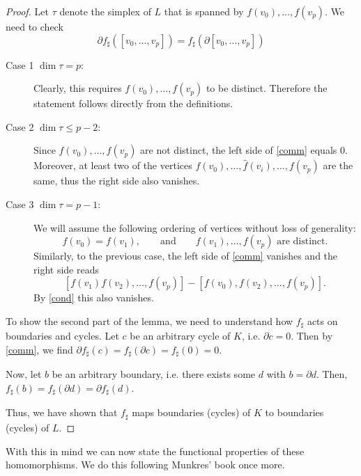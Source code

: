 \documentclass[toc=bib, headinclude]{scrartcl}
\theoremstyle{plain}
\theoremstyle{definition}
\theoremstyle{remark}
\newcommand{\qqandqq}{\qquad \text{and} \qquad}
\begin{document}
\begin{proof}

	Let $\tau$ denote the simplex of $L$ that is spanned by $f(v_0),\dots,f(v_p)$. We need to check 
	\begin{equation}\label{comm}
		\partial f_\sharp([v_0,\dots,v_p])=f_\sharp(\partial[v_0,\dots,v_p])
	\end{equation}
	\begin{description}
		\item[Case 1 ${\dim\tau=p}$:] Clearly, this requires $f(v_0),\dots,f(v_p)$ to be distinct. Therefore the statement follows directly from the definitions. %
		\item[Case 2 ${\dim\tau\leq p-2}$:] %
	Since $f(v_0),\dots,f(v_p)$ are not distinct, the left side of \eqref{comm} equals 0. Moreover, at least two of the vertices $f(v_0),\dots,\hat{f}(v_i),\dots,f(v_p)$ are the same, thus the right side also vanishes.
		\item[Case 3 ${\dim\tau=p-1}$:] We will assume the following ordering of vertices without loss of generality:
		\begin{equation}\label{cond}
		f(v_0)=f(v_1), \qqandqq f(v_1),\dots,f(v_p) \text{ are distinct.}
		\end{equation}
		Similarly, to the previous case, the left side of \eqref{comm} vanishes and the right side reads
		\[
		[f(v_1)f(v_2),\dots,f(v_p)]-[f(v_0),f(v_2),...,f(v_p)].
		\]
		By \eqref{cond} this also vanishes. 
	\end{description}

To show the second part of the lemma, we need to understand how $f_\sharp$ acts on boundaries and cycles. Let $c$ be an arbitrary cycle of $K$, i.e. $\partial c=0$. Then by \eqref{comm}, we find $\partial f_\sharp (c)=f_\sharp (\partial c)=f_\sharp(0)=0$.

Now, let $b$ be an arbitrary boundary, i.e. there exists some $d$ with $b=\partial d$. Then, $f_\sharp(b)=f_\sharp(\partial d)=\partial f_\sharp(d)$. 

Thus, we have shown that $f_\sharp$ maps boundaries (cycles) of $K$ to boundaries (cycles) of $L$. 
\end{proof}

With this in mind we can now state the functional properties of these homomorphisms. We do this following Munkres' book \cite[Theorem 12.2, p. 63]{mu} once more.
\end{document}
